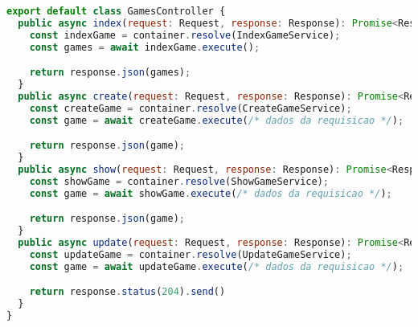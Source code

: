\begin{lstlisting}[language=JavaScript, caption={Adaptador de Interfaces da Web},captionpos=b, label=alg:gamescontroller]    
export default class GamesController {
  public async index(request: Request, response: Response): Promise<Response> {
    const indexGame = container.resolve(IndexGameService);
    const games = await indexGame.execute();

    return response.json(games);
  }
  public async create(request: Request, response: Response): Promise<Response> {
    const createGame = container.resolve(CreateGameService);
    const game = await createGame.execute(/* dados da requisicao */);

    return response.json(game);
  }
  public async show(request: Request, response: Response): Promise<Response> {
    const showGame = container.resolve(ShowGameService);
    const game = await showGame.execute(/* dados da requisicao */);

    return response.json(game);
  }
  public async update(request: Request, response: Response): Promise<Response> {
    const updateGame = container.resolve(UpdateGameService);
    const game = await updateGame.execute(/* dados da requisicao */);

    return response.status(204).send()
  }
}    
\end{lstlisting}
